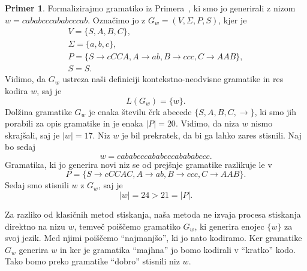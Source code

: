 \documentclass{amsart}
\theoremstyle{definition} %
\newtheorem{primer}[definicija]{Primer}
\theoremstyle{plain} %
\begin{document}
\begin{primer}
    
    Formalizirajmo gramatiko iz Primera~, ki smo jo generirali z nizom
    $ w = cababcccababcccab $. Označimo jo z $ G_w = ( V, \Sigma, P, S ) $, kjer je 
    \begin{gather*}
        V = \{ S, A, B, C \}, \\
        \Sigma = \{ a, b, c \}, \\
        P = \{ S  \rightarrow  cCCA, A  \rightarrow  ab, B  
        \rightarrow  ccc, C  \rightarrow  AAB \}, \\
        S = S.
    \end{gather*}
    Vidimo, da $ G_w $ ustreza naši definiciji kontekstno-neodvisne gramatike
    in res kodira $ w $, saj je 
    \[
        L(G_w) = \{w\}.
    \]
    Dolžina gramatike $ G_w $ je enaka številu črk abecede $ \{ S, A, B, C, \rightarrow \} $,
    ki smo jih porabili za opis gramatike in je enaka $ |P| = 20 $. Vidimo, da niza $ w $ 
    nismo skrajšali, saj je $ |w| = 17 $. Niz $ w $ je bil prekratek, da bi ga lahko
    zares stisnili. Naj bo sedaj
    \[
        w =   cababcccababcccabababccc.
    \]
    Gramatika, ki jo generira novi niz se od prejšnje gramatike razlikuje le v
    \[
        P = \{ S  \rightarrow  cCCAC, A  \rightarrow  ab, B  
        \rightarrow  ccc, C  \rightarrow  AAB \}.
    \]
    Sedaj smo stisnili $ w $ z $ G_w $, saj je
    \[
        |w| = 24 > 21 = |P|.
    \]

\end{primer}

Za razliko od klasičnih metod stiskanja, naša metoda ne izvaja procesa stiskanja
direktno na nizu $ w $, temveč poiščemo gramatiko $ G_w $, ki generira 
enojec $ \{ w \} $ za svoj jezik. Med njimi poiščemo ``najmanjšo'', ki jo nato kodiramo.
Ker gramatike $ G_w $ generira $ w $ in ker je gramatika ``majhna'' jo bomo kodirali v 
``kratko'' kodo. Tako bomo preko gramatike ``dobro'' stisnili niz $ w $.
\end{document}
